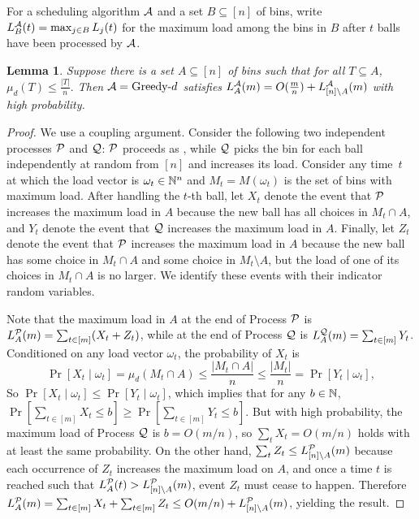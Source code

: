 \documentclass[10pt,conference,letterpaper]{IEEEtran}
\newtheorem{lemma}[theorem]{Lemma}
\begin{document}
For a scheduling algorithm ${\mathcal A}$ and a set $B \subseteq [n]$ of bins, write $L^{\mathcal A}_B(t) = 
\max_{j\in B} L_j(t)$ for the maximum load among the bins in $B$ after $t$ balls have been
processed by ${\mathcal A}$.
\begin{lemma}\label{lem:perfect}
Suppose there is a set $A \subseteq [n]$ of bins such that for all $T \subseteq A$,
        $ \mu_d(T) \le \frac{|T|}{n}. $
Then ${\mathcal A}=\text{{\textsc Greedy-$d$}}$ satisfies $L^{\mathcal A}_A(m) = O(\frac{m}{n}) + L^{\mathcal A}_{[n]\setminus A}(m)$ with high probability.
\end{lemma}
\begin{proof}
We use a coupling argument. Consider the following two independent processes ${\mathcal P}$ and ${\mathcal Q}$: ${\mathcal P}$ proceeds as
, while ${\mathcal Q}$ picks the bin for each ball independently at
random from $[n]$ and increases its load. Consider any time~$t$ at which the load vector is $\omega_t \in {\mathbb N}^n$
and $M_t=M(\omega_t)$ is the set of bins with
maximum load. After handling the $t$-th ball, let $X_t$ denote the event that ${\mathcal P}$ increases the maximum load in $A$ because the new ball has all choices in
$M_t \cap A$, and $Y_t$ denote the event that ${\mathcal Q}$ increases the maximum load in $A$. Finally, let $Z_t$ denote the event
that ${\mathcal P}$ increases the maximum load in $A$ because the new ball has some choice in $M_t \cap A$ and some choice in $M_t \setminus
A$, but the load of one of  its choices in $M_t \cap A$ is no larger. We identify these events with their indicator
random variables.

Note that the maximum load in $A$ at the end of Process ${\mathcal P}$ is $L_A^{\mathcal P}(m) = \sum_{t\in[m]} (X_t + Z_t)$, while  at the
end of Process ${\mathcal Q}$ is $L_A^{\mathcal Q}(m) = \sum_{t\in[m]}
Y_t$. Conditioned on any load vector $\omega_t$, the probability of $X_t$ is $$\Pr[ X_t \mid \omega_t] =
\mu_d(M_t \cap A) \le \frac{|M_t \cap A|}{n}  \le \frac{|M_t|}{n} = \Pr[ Y_t \mid \omega_t ],$$
So $\Pr [ X_t   \mid
\omega_t ] \le \Pr [Y_t \mid \omega_t]$, which implies that for any $b \in {\mathbb N}$, $\Pr [ \sum_{t \in [m]} X_t
\le b ] \ge \Pr[
\sum_{t \in [m]} Y_t
\le b ].$ But with high probability, the maximum load of Process ${\mathcal Q}$ is $b = O(m / n)$, so $\sum_t X_t = O(m / n)$
holds with at least the same probability. On the other hand, $\sum_t Z_t \le L_{[n]\setminus A}^{\mathcal P}(m)$ because each occurrence of
$Z_t$ increases the maximum load on $A$, and once a time $t$ is reached such that $L_A^{\mathcal P}(t) > L_{[n]\setminus
    A}^{\mathcal P}(m)$, event $Z_t$ must cease to happen. Therefore
$L_A^{\mathcal P}(m) = \sum_{t\in[m]} X_t + \sum_{t\in[m]} Z_t \le O(m / n) + L_{[n]\setminus A}^{\mathcal P}(m)$,
yielding the result.
\end{proof}
\end{document}
